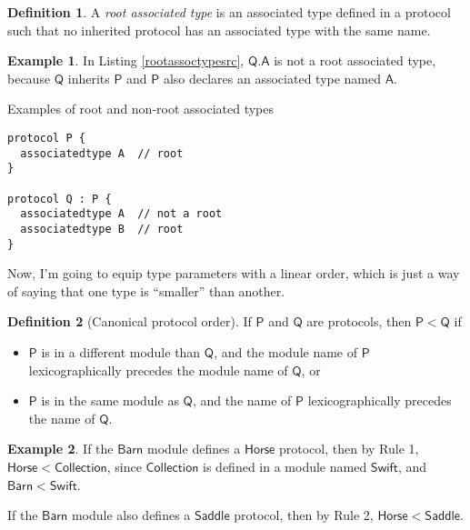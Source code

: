 \documentclass[headsepline,bibliography=totoc]{scrreport}
\newcommand{\namesym}[1]{\mathsf{#1}}
\newcommand{\proto}[1]{\bm{\mathsf{#1}}}
\theoremstyle{definition}
\newtheorem{example}{Example}[chapter]
\theoremstyle{definition}
\newtheorem{definition}{Definition}[chapter]
\theoremstyle{definition}
\begin{document}
\begin{definition}\label{rootassoctypedef} A \emph{root associated type} is an associated type defined in a protocol such that no inherited protocol has an associated type with the same name.
\end{definition}
\begin{example}
In Listing \ref{rootassoctypesrc}, $\proto{Q}.\namesym{A}$ is not a root associated type, because $\proto{Q}$ inherits $\proto{P}$ and $\proto{P}$ also declares an associated type named $\namesym{A}$.
\end{example}
\begin{listing}\caption{Examples of root and non-root associated types}\label{rootassoctypesrc}
\begin{Verbatim}
protocol P {
  associatedtype A  // root
}

protocol Q : P {
  associatedtype A  // not a root
  associatedtype B  // root
}
\end{Verbatim}
\end{listing}
Now, I'm going to equip type parameters with a linear order, which is just a way of saying that one type is ``smaller'' than another.
\begin{definition}[Canonical protocol order]\label{canonicalprotocol} If $\bm{\mathsf{P}}$ and $\bm{\mathsf{Q}}$ are protocols, then $\bm{\mathsf{P}} < \bm{\mathsf{Q}}$ if
\begin{itemize}
\item $\bm{\mathsf{P}}$ is in a different module than $\bm{\mathsf{Q}}$, and the module name of $\bm{\mathsf{P}}$ lexicographically precedes the module name of $\bm{\mathsf{Q}}$, or
\item $\bm{\mathsf{P}}$ is in the same module as $\bm{\mathsf{Q}}$, and the name of $\bm{\mathsf{P}}$ lexicographically precedes the name of $\bm{\mathsf{Q}}$.
\end{itemize}
\end{definition}

\begin{example} If the $\namesym{Barn}$ module defines a $\proto{Horse}$ protocol, then by Rule 1, $\proto{Horse}<\proto{Collection}$, since $\proto{Collection}$ is defined in a module named $\namesym{Swift}$, and $\namesym{Barn}<\namesym{Swift}$.

If the $\namesym{Barn}$ module also defines a $\proto{Saddle}$ protocol, then by Rule 2, $\proto{Horse}<\proto{Saddle}$.
\end{example} 
\end{document}

